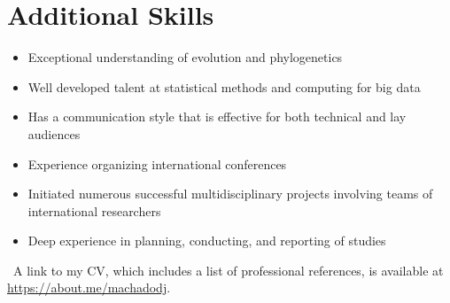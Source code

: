 \section{Additional Skills}
    \begin{itemize}
        \item Exceptional understanding of evolution and phylogenetics
        \item Well developed talent at statistical methods and computing for big data
        \item Has a communication style that is effective for both technical and lay audiences
        \item Experience organizing international conferences
        \item Initiated numerous successful multidisciplinary projects involving teams of international researchers
        \item Deep experience in planning, conducting, and reporting of studies
    \end{itemize}

\vfill

{\color{MyLightBlue}~A link to my CV, which includes a list of professional references, is available at \href{https://about.me/machadodj}{https://about.me/machadodj}.}